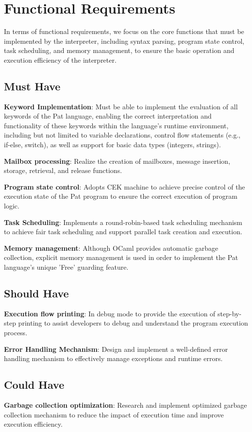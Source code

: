 \documentclass{l4proj}
\begin{document}
\section{Functional Requirements}
In terms of functional requirements, we focus on the core functions that must be implemented by the interpreter, including syntax parsing, program state control, task scheduling, and memory management, to ensure the basic operation and execution efficiency of the interpreter.

\subsection{Must Have}
\textbf{Keyword Implementation}: Must be able to implement the evaluation of all keywords of the Pat language, enabling the correct interpretation and functionality of these keywords within the language's runtime environment, including but not limited to variable declarations, control flow statements (e.g., if-else, switch), as well as support for basic data types (integers, strings).

\textbf{Mailbox processing}: Realize the creation of mailboxes, message insertion, storage, retrieval, and release functions.

\textbf{Program state control}: Adopts CEK machine to achieve precise control of the execution state of the Pat program to ensure the correct execution of program logic.

\textbf{Task Scheduling}: Implements a round-robin-based task scheduling mechanism to achieve fair task scheduling and support parallel task creation and execution.

\textbf{Memory management}: Although OCaml provides automatic garbage collection, explicit memory management is used in order to implement the Pat language's unique 'Free' guarding feature.

\subsection{Should Have}
\textbf{Execution flow printing}: In debug mode to provide the execution of step-by-step printing to assist developers to debug and understand the program execution process.

\textbf{Error Handling Mechanism}: Design and implement a well-defined error handling mechanism to effectively manage exceptions and runtime errors.

\subsection{Could Have}
\textbf{Garbage collection optimization}: Research and implement optimized garbage collection mechanism to reduce the impact of execution time and improve execution efficiency.
\end{document}
